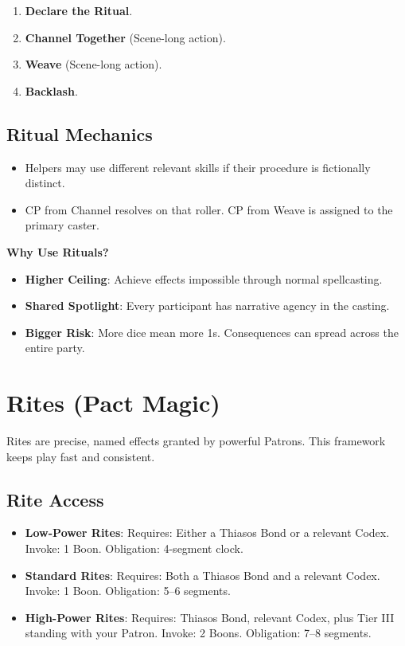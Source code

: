 \begin{enumerate}
    \item \textbf{Declare the Ritual}.
    \item \textbf{Channel Together} (Scene-long action).
    \item \textbf{Weave} (Scene-long action).
    \item \textbf{Backlash}.
\end{enumerate}

\subsection*{Ritual Mechanics}

\begin{itemize}
    \item Helpers may use different relevant skills if their procedure is fictionally distinct.
    \item CP from Channel resolves on that roller. CP from Weave is assigned to the primary caster.
\end{itemize}

\textbf{Why Use Rituals?}

\begin{itemize}
    \item \textbf{Higher Ceiling}: Achieve effects impossible through normal spellcasting.
    \item \textbf{Shared Spotlight}: Every participant has narrative agency in the casting.
    \item \textbf{Bigger Risk}: More dice mean more 1s. Consequences can spread across the entire party.
\end{itemize}

\section*{Rites (Pact Magic)}

Rites are precise, named effects granted by powerful Patrons. This framework keeps play fast and consistent.

\subsection*{Rite Access}

\begin{itemize}
    \item \textbf{Low-Power Rites}: Requires: Either a Thiasos Bond or a relevant Codex. Invoke: 1 Boon. Obligation: 4-segment clock.
    \item \textbf{Standard Rites}: Requires: Both a Thiasos Bond and a relevant Codex. Invoke: 1 Boon. Obligation: 5--6 segments.
    \item \textbf{High-Power Rites}: Requires: Thiasos Bond, relevant Codex, plus Tier III standing with your Patron. Invoke: 2 Boons. Obligation: 7--8 segments.
\end{itemize}


